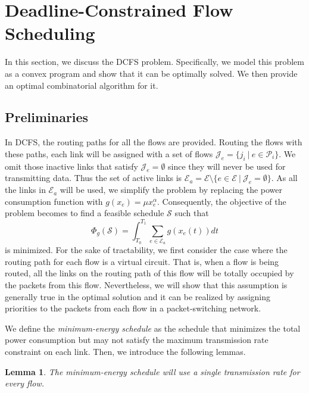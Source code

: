 \documentclass[10pt, conference, compsocconf]{IEEEtran}
\newtheorem{lemma}{Lemma}
\begin{document}
\section{Deadline-Constrained Flow Scheduling}
\label{sec:dts}

In this section, we discuss the DCFS problem. Specifically, we model this problem as a convex program and show that it can be optimally solved. We then provide an optimal combinatorial algorithm for it.

\subsection{Preliminaries}

In DCFS, the routing paths for all the flows are provided. Routing the flows with these paths, each link will be assigned with a set of flows $\mathcal{J}_e = \{j_i~|~e \in \mathcal{P}_i\}$.
We omit those inactive links that satisfy $\mathcal{J}_e = \emptyset$ since they will never be used for transmitting data. Thus the set of active links is $\mathcal{E}_a = \mathcal{E} \setminus \{e \in \mathcal{E}~|~\mathcal{J}_e = \emptyset\}$. As all the links in $\mathcal{E}_a$ will be used, we simplify the problem by replacing the power consumption function with $g(x_e) = \mu x_e^{\alpha}$. Consequently, the objective of the problem becomes to find a feasible schedule $\mathcal{S}$ such that
\begin{equation}
\Phi_g (\mathcal{S}) = \int_{T_0}^{T_1} \sum_{e \in \mathcal{E}_a}g\left(x_e(t)\right)dt 
\end{equation}
is minimized. For the sake of tractability, we first consider the case where the routing path for each flow is a virtual circuit. That is, when a flow is being routed, all the links on the routing path of this flow will be totally occupied by the packets from this flow. Nevertheless, we will show that this assumption is generally true in the optimal solution and it can be realized by assigning priorities to the packets from each flow in a packet-switching network. 

We define the \emph{minimum-energy schedule} as the schedule that minimizes the total power consumption but may not satisfy the maximum transmission rate constraint on each link. Then, we introduce the following lemmas.
\begin{lemma}
\label{lm:unique}
The minimum-energy schedule will use a single transmission rate for every flow.
\end{lemma}
\end{document}
